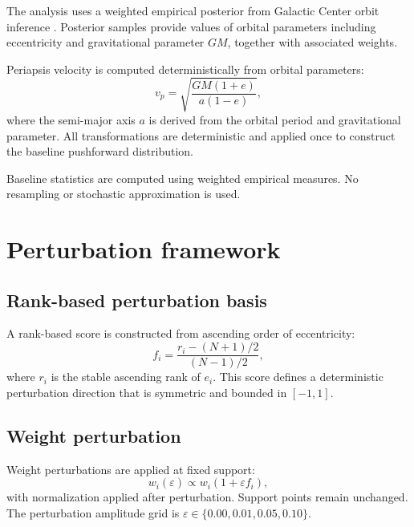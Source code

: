 \documentclass[a4paper,fleqn,usenatbib]{mnras}
\begin{document}
The analysis uses a weighted empirical posterior from Galactic Center orbit
inference \citep{Do2019}. Posterior samples provide values of orbital
parameters including eccentricity and gravitational parameter $GM$, together
with associated weights.

Periapsis velocity is computed deterministically from orbital parameters:
\begin{equation}
  v_p = \sqrt{\frac{GM(1+e)}{a(1-e)}},
  \label{eq:vp}
\end{equation}
where the semi-major axis $a$ is derived from the orbital period and
gravitational parameter. All transformations are deterministic and applied once
to construct the baseline pushforward distribution.

Baseline statistics are computed using weighted empirical measures. No
resampling or stochastic approximation is used.

\section{Perturbation framework}
\label{sec:framework}

\subsection{Rank-based perturbation basis}
\label{sec:rankbasis}

A rank-based score is constructed from ascending order of eccentricity:
\begin{equation}
  f_i = \frac{r_i - (N+1)/2}{(N-1)/2},
  \label{eq:fi}
\end{equation}
where $r_i$ is the stable ascending rank of $e_i$. This score defines a
deterministic perturbation direction that is symmetric and bounded in
$[-1, 1]$.

\subsection{Weight perturbation}
\label{sec:weightpert}

Weight perturbations are applied at fixed support:
\begin{equation}
  w_i(\varepsilon) \propto w_i(1 + \varepsilon f_i),
  \label{eq:wpert}
\end{equation}
with normalization applied after perturbation. Support points remain
unchanged. The perturbation amplitude grid is
$\varepsilon \in \{0.00, 0.01, 0.05, 0.10\}$.
\end{document}
